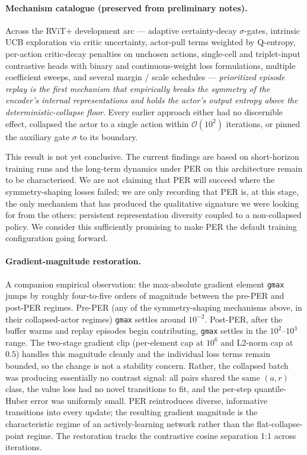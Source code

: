 \documentclass[11pt]{article}
\begin{document}
\paragraph{Mechanism catalogue (preserved from preliminary notes).}

Across the RViT$+$ development arc — adaptive certainty-decay
$\sigma$-gates, intrinsic UCB exploration via critic uncertainty,
actor-pull terms weighted by Q-entropy, per-action critic-decay
penalties on unchosen actions, single-cell and triplet-input
contrastive heads with binary and continuous-weight loss formulations,
multiple coefficient sweeps, and several margin / scale schedules —
\emph{prioritized episode replay is the first mechanism that
empirically breaks the symmetry of the encoder's internal
representations and holds the actor's output entropy above the
deterministic-collapse floor}. Every earlier approach either had no
discernible effect, collapsed the actor to a single action within
$\mathcal{O}(10^2)$ iterations, or pinned the auxiliary gate
$\sigma$ to its boundary.

This result is not yet conclusive. The current findings are based on
short-horizon training runs and the long-term dynamics under PER on
this architecture remain to be characterised. We are not claiming
that PER will succeed where the symmetry-shaping losses failed; we
are only recording that PER is, at this stage, the only mechanism
that has produced the qualitative signature we were looking for from
the others: persistent representation diversity coupled to a
non-collapsed policy. We consider this sufficiently promising to
make PER the default training configuration going forward.

\paragraph{Gradient-magnitude restoration.}
A companion empirical observation: the max-absolute gradient element
\texttt{gmax} jumps by roughly four-to-five orders of magnitude
between the pre-PER and post-PER regimes. Pre-PER (any of the
symmetry-shaping mechanisms above, in their collapsed-actor regimes)
\texttt{gmax} settles around $10^{-2}$. Post-PER, after the buffer
warms and replay episodes begin contributing,
\texttt{gmax} settles in the $10^{2}$--$10^{3}$ range. The two-stage
gradient clip (per-element cap at $10^{6}$ and L2-norm cap at $0.5$)
handles this magnitude cleanly and the individual loss terms remain
bounded, so the change is not a stability concern. Rather, the
collapsed batch was producing essentially no contrast signal: all
pairs shared the same $(a, r)$ class, the value loss had no novel
transitions to fit, and the per-step quantile-Huber error was
uniformly small. PER reintroduces diverse, informative transitions
into every update; the resulting gradient magnitude is the
characteristic regime of an actively-learning network rather than
the flat-collapse-point regime. The restoration tracks the
contrastive cosine separation 1:1 across iterations.
\end{document}
